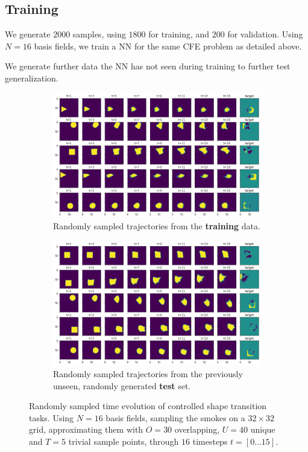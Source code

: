 \subsection*{Training}
We generate $2000$ samples, using $1800$ for training, and $200$ for validation.
Using $N=16$ basis fields, we train a \ac{NN} for the same \ac{CFE} problem as
detailed above. 

We generate further data the \ac{NN} has not seen during training to further
test generalization. 

\begin{figure}
  \centering
  \begin{subfigure}{\textwidth}
    \centering
    \includegraphics[width=\textwidth]{figures/nn-final/trained_trajectories_horizontal.png}
    \caption{Randomly sampled trajectories from the \textbf{training} data.}
  \end{subfigure}
  \begin{subfigure}{\textwidth}
    \centering
    \includegraphics[width=\textwidth]{figures/nn-final/test_trajectories_horizontal.png}
    \caption{Randomly sampled trajectories from the previously unseen, randomly
    generated \textbf{test} set.}
  \end{subfigure}
  \caption{Randomly sampled time evolution of controlled shape transition
  tasks. Using $N=16$ basis fields, sampling the smokes on a $32\times 32$ grid,
  approximating them with $O=30$ overlapping, $U=40$ unique and $T=5$ trivial
  sample points, through $16$ timesteps $t=[0\dots15]$.}
  \label{fig:NN-shape-transition}
\end{figure}

